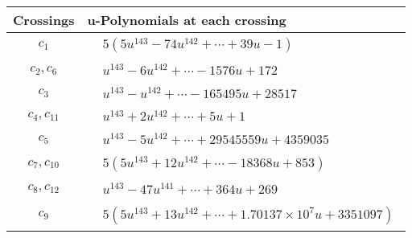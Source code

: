 \documentclass[1p]{elsarticle_modified}
\theoremstyle{definition}
\begin{document}
\begin{tabular}{m{50pt}|m{274pt}}
Crossings & \hspace{64pt}u-Polynomials at each crossing \\
\hline $$\begin{aligned}c_{1}\end{aligned}$$&$\begin{aligned}
&5(5 u^{143}-74 u^{142}+\cdots+39 u-1)
\end{aligned}$\\
\hline $$\begin{aligned}c_{2},c_{6}\end{aligned}$$&$\begin{aligned}
&u^{143}-6 u^{142}+\cdots-1576 u+172
\end{aligned}$\\
\hline $$\begin{aligned}c_{3}\end{aligned}$$&$\begin{aligned}
&u^{143}- u^{142}+\cdots-165495 u+28517
\end{aligned}$\\
\hline $$\begin{aligned}c_{4},c_{11}\end{aligned}$$&$\begin{aligned}
&u^{143}+2 u^{142}+\cdots+5 u+1
\end{aligned}$\\
\hline $$\begin{aligned}c_{5}\end{aligned}$$&$\begin{aligned}
&u^{143}-5 u^{142}+\cdots+29545559 u+4359035
\end{aligned}$\\
\hline $$\begin{aligned}c_{7},c_{10}\end{aligned}$$&$\begin{aligned}
&5(5 u^{143}+12 u^{142}+\cdots-18368 u+853)
\end{aligned}$\\
\hline $$\begin{aligned}c_{8},c_{12}\end{aligned}$$&$\begin{aligned}
&u^{143}-47 u^{141}+\cdots+364 u+269
\end{aligned}$\\
\hline $$\begin{aligned}c_{9}\end{aligned}$$&$\begin{aligned}
&5(5 u^{143}+13 u^{142}+\cdots+1.70137\times10^{7} u+3351097)
\end{aligned}$\\
\hline
\end{tabular}\\~\\
\end{document}
